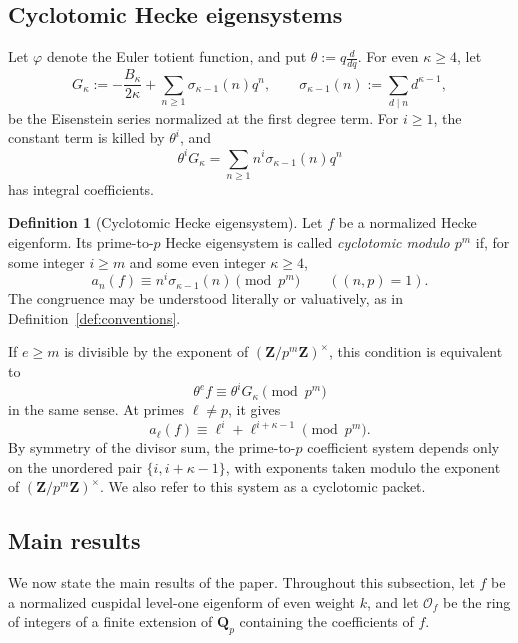 \documentclass[11pt]{article}
\theoremstyle{plain}
\theoremstyle{definition}
\newtheorem{definition}[theorem]{Definition}
\theoremstyle{remark}
\numberwithin{equation}{section}
\begin{document}
\subsection{Cyclotomic Hecke eigensystems}

Let \(\varphi\) denote the Euler totient function, and put \(\theta:=q\frac{d}{dq}\). For even \(\kappa\geq4\), let \[ G_\kappa:=-\frac{B_\kappa}{2\kappa} +\sum_{n\geq1}\sigma_{\kappa-1}(n)q^n, \qquad \sigma_{\kappa-1}(n):=\sum_{d\mid n}d^{\kappa-1}, \] be the Eisenstein series normalized at the first degree term. For \(i\geq1\), the constant term is killed by \(\theta^i\), and \[ \theta^iG_\kappa =\sum_{n\geq1}n^i\sigma_{\kappa-1}(n)q^n \] has integral coefficients.

\begin{definition}[Cyclotomic Hecke eigensystem] \label{def:theta-eis} Let \(f\) be a normalized Hecke eigenform. Its prime-to-\(p\) Hecke eigensystem is called \emph{cyclotomic modulo \(p^m\)} if, for some integer \(i\geq m\) and some even integer \(\kappa\geq4\), \[ a_n(f)\equiv n^i\sigma_{\kappa-1}(n)\pmod{p^m} \qquad ((n,p)=1). \] The congruence may be understood literally or valuatively, as in Definition~\ref{def:conventions}.
\end{definition}

If \(e\geq m\) is divisible by the exponent of \((\mathbf Z/p^m\mathbf Z)^\times\), this condition is equivalent to \[ \theta^e f\equiv\theta^iG_\kappa\pmod{p^m} \] in the same sense. At primes \(\ell\ne p\), it gives \[ a_\ell(f)\equiv\ell^i+\ell^{i+\kappa-1}\pmod{p^m}. \] By symmetry of the divisor sum, the prime-to-\(p\) coefficient system depends only on the unordered pair \(\{i,i+\kappa-1\}\), with exponents taken modulo the exponent of \((\mathbf Z/p^m\mathbf Z)^\times\). We also refer to this system as a cyclotomic packet. 

\subsection{Main results}

We now state the main results of the paper. Throughout this subsection, let \(f\) be a normalized cuspidal level-one eigenform of even weight \(k\), and let \(\mathcal O_f\) be the ring of integers of a finite extension of \(\mathbf Q_p\) containing the coefficients of \(f\). 
\end{document}
